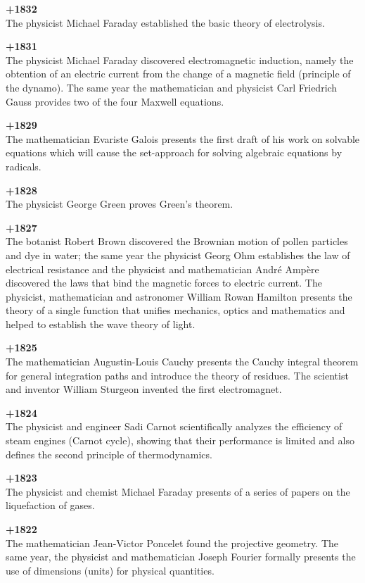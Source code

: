 \textbf{+1832}\\
The physicist Michael Faraday established the basic theory of electrolysis.

\textbf{+1831}\\
The physicist Michael Faraday discovered electromagnetic induction, namely the obtention of an electric current from the change of a magnetic field (principle of the dynamo). The same year the mathematician and physicist Carl Friedrich Gauss provides two of the four Maxwell equations.

\pagebreak
\textbf{+1829}\\
The mathematician Evariste Galois presents the first draft of his work on solvable equations which will cause the set-approach for solving algebraic equations by radicals.

\textbf{+1828}\\
The physicist George Green proves Green's theorem.

\textbf{+1827}\\
The botanist Robert Brown discovered the Brownian motion of pollen particles and dye in water; the same year the physicist Georg Ohm establishes the law of electrical resistance and the physicist and mathematician André Ampère discovered the laws that bind the magnetic forces to electric current. The physicist, mathematician and astronomer William Rowan Hamilton presents the theory of a single function that unifies mechanics, optics and mathematics and helped to establish the wave theory of light.

\textbf{+1825}\\
The mathematician Augustin-Louis Cauchy presents the Cauchy integral theorem for general integration paths and introduce the theory of residues. The scientist and inventor William Sturgeon invented the first electromagnet.

\textbf{+1824}\\
The physicist and engineer Sadi Carnot scientifically analyzes the efficiency of steam engines (Carnot cycle), showing that their performance is limited and also defines the second principle of thermodynamics.

\textbf{+1823}\\
The physicist and chemist Michael Faraday presents of a series of papers on the liquefaction of gases.

\textbf{+1822}\\
The mathematician Jean-Victor Poncelet found the projective geometry. The same year, the physicist and mathematician Joseph Fourier formally presents the use of dimensions (units) for physical quantities.

